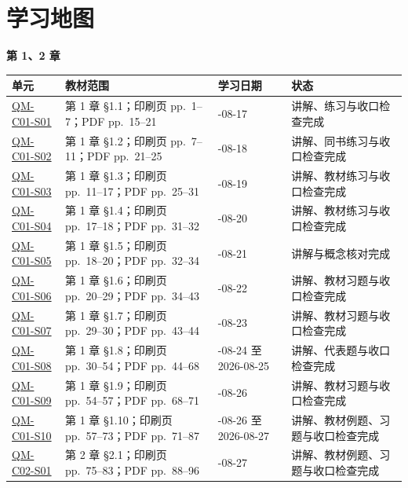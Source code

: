 \section*{学习地图}

\textbf{第 1、2 章}

\begin{center}
\footnotesize
\renewcommand{\arraystretch}{1.0}
\begin{tabularx}{\textwidth}{@{}>{\raggedright\arraybackslash}p{2.7cm}>{\raggedright\arraybackslash}p{4.1cm}>{\raggedright\arraybackslash}p{3.0cm}X@{}}
  \toprule
  单元 & 教材范围 & 学习日期 & 状态 \\
  \midrule
  \hyperref[section:QM-C01-S01]{QM-C01-S01} & 第 1 章 \S 1.1；印刷页 pp.~1--7；PDF pp.~15--21 & 2026-08-17 & 讲解、练习与收口检查完成 \\
  \hyperref[section:QM-C01-S02]{QM-C01-S02} & 第 1 章 \S 1.2；印刷页 pp.~7--11；PDF pp.~21--25 & 2026-08-18 & 讲解、同书练习与收口检查完成 \\
  \hyperref[section:QM-C01-S03]{QM-C01-S03} & 第 1 章 \S 1.3；印刷页 pp.~11--17；PDF pp.~25--31 & 2026-08-19 & 讲解、教材练习与收口检查完成 \\
  \hyperref[section:QM-C01-S04]{QM-C01-S04} & 第 1 章 \S 1.4；印刷页 pp.~17--18；PDF pp.~31--32 & 2026-08-20 & 讲解、教材练习与收口检查完成 \\
  \hyperref[section:QM-C01-S05]{QM-C01-S05} & 第 1 章 \S 1.5；印刷页 pp.~18--20；PDF pp.~32--34 & 2026-08-21 & 讲解与概念核对完成 \\
  \hyperref[section:QM-C01-S06]{QM-C01-S06} & 第 1 章 \S 1.6；印刷页 pp.~20--29；PDF pp.~34--43 & 2026-08-22 & 讲解、教材习题与收口检查完成 \\
  \hyperref[section:QM-C01-S07]{QM-C01-S07} & 第 1 章 \S 1.7；印刷页 pp.~29--30；PDF pp.~43--44 & 2026-08-23 & 讲解、教材习题与收口检查完成 \\
  \hyperref[section:QM-C01-S08]{QM-C01-S08} & 第 1 章 \S 1.8；印刷页 pp.~30--54；PDF pp.~44--68 & 2026-08-24 至 2026-08-25 & 讲解、代表题与收口检查完成 \\
  \hyperref[section:QM-C01-S09]{QM-C01-S09} & 第 1 章 \S 1.9；印刷页 pp.~54--57；PDF pp.~68--71 & 2026-08-26 & 讲解、教材习题与收口检查完成 \\
  \hyperref[section:QM-C01-S10]{QM-C01-S10} & 第 1 章 \S 1.10；印刷页 pp.~57--73；PDF pp.~71--87 & 2026-08-26 至 2026-08-27 & 讲解、教材例题、习题与收口检查完成 \\
  \hyperref[section:QM-C02-S01]{QM-C02-S01} & 第 2 章 \S 2.1；印刷页 pp.~75--83；PDF pp.~88--96 & 2026-08-27 & 讲解、教材例题、习题与收口检查完成 \\

\end{tabularx}
\end{center}
